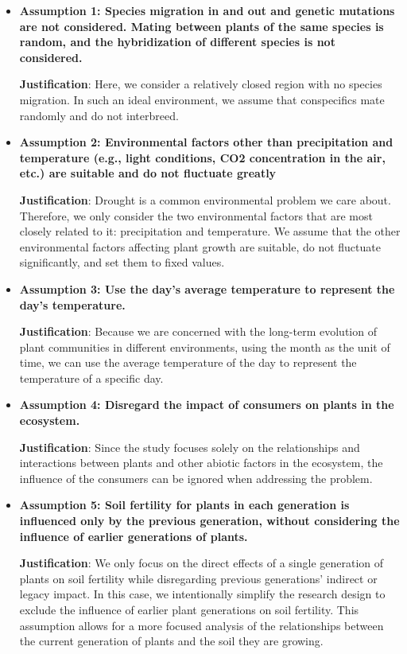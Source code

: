 \documentclass{mcmthesis}
\begin{document}
\begin{itemize}
\item {\bf Assumption 1: Species migration in and out and genetic mutations are not considered. Mating between plants of the same species is random, and the hybridization of different species is not considered.}

{\bf Justification}: Here, we consider a relatively closed region with no species migration. In such an ideal environment, we assume that conspecifics mate randomly and do not interbreed.

\item {\bf Assumption 2: Environmental factors other than precipitation and temperature (e.g., light conditions, CO2 concentration in the air, etc.) are suitable and do not fluctuate greatly}

{\bf Justification}: Drought is a common environmental problem we care about. Therefore, we only consider the two environmental factors that are most closely related to it: precipitation and temperature. We assume that the other environmental factors affecting plant growth are suitable, do not fluctuate significantly, and set them to fixed values.

\item {\bf Assumption 3: Use the day's average temperature to represent the day's temperature.}

{\bf Justification}: Because we are concerned with the long-term evolution of plant communities in different environments, using the month as the unit of time, we can use the average temperature of the day to represent the temperature of a specific day.

\item {\bf Assumption 4: Disregard the impact of consumers on plants in the ecosystem.}

{\bf Justification}: Since the study focuses solely on the relationships and interactions between plants and other abiotic factors in the ecosystem, the influence of the consumers can be ignored when addressing the problem.

\item {\bf Assumption 5: Soil fertility for plants in each generation is influenced only by the previous generation, without considering the influence of earlier generations of plants.}

{\bf Justification}: We only focus on the direct effects of a single generation of plants on soil fertility while disregarding previous generations' indirect or legacy impact. In this case, we intentionally simplify the research design to exclude the influence of earlier plant generations on soil fertility. This assumption allows for a more focused analysis of the relationships between the current generation of plants and the soil they are growing.

\end{itemize}
\end{document}
